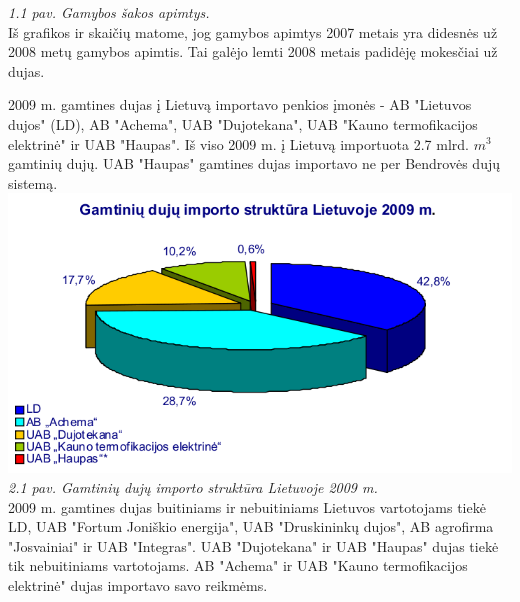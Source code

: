\documentclass[11pt,a4paper]{article}
\begin{document}
\begin{center}
\end{center}
\textsl{1.1 pav. Gamybos šakos apimtys.}\\

Iš grafikos ir skaičių matome, jog gamybos apimtys 2007 metais yra didesnės už 
2008 metų gamybos apimtis. Tai galėjo lemti 2008 metais padidėję mokesčiai už 
dujas.

2009 m. gamtines dujas į Lietuvą importavo penkios įmonės - AB "Lietuvos dujos" (LD), 
AB "Achema", UAB "Dujotekana", UAB "Kauno termofikacijos elektrinė" ir UAB "Haupas". 
Iš viso 2009 m. į Lietuvą importuota 2.7 mlrd. $m^3$ gamtinių dujų. UAB "Haupas" 
gamtines dujas importavo ne per Bendrovės dujų sistemą.\\

\includegraphics[width=400pt]{gamtiniu_duju_importo_struktura_lietuvoje_2009.png}\\
\textsl{2.1 pav. Gamtinių dujų importo struktūra Lietuvoje 2009 m.}\\

2009 m. gamtines dujas buitiniams ir nebuitiniams Lietuvos vartotojams tiekė LD, 
UAB "Fortum Joniškio energija", UAB "Druskininkų dujos", AB agrofirma "Josvainiai" 
ir UAB "Integras". UAB "Dujotekana" ir UAB "Haupas" dujas tiekė tik nebuitiniams 
vartotojams. AB "Achema" ir UAB "Kauno termofikacijos elektrinė" dujas importavo 
savo reikmėms.
\end{document}
